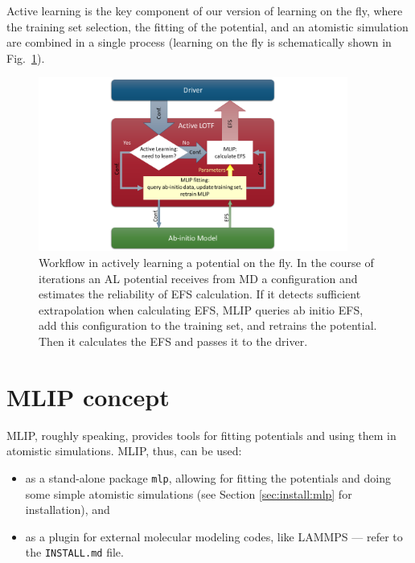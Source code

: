 \documentclass[12pt]{article}
\renewcommand{\_}{\char`_}
\begin{document}
Active learning is the key component of our version of learning on the fly, where the training set selection, the fitting of the potential, and an atomistic simulation are combined in a single process (learning on the fly is schematically shown in Fig.\ \ref{fig:LOTF}).

\begin{figure}[htbp]
	\centering
	\includegraphics[width=4.0in]{figs/LOTF.pdf}
	\caption{Workflow in actively learning a potential on the fly.
		In the course of iterations an AL potential receives from MD a configuration and estimates the reliability of EFS calculation.
		If it detects sufficient extrapolation when calculating EFS, MLIP queries ab initio EFS, add this configuration to the training set, and retrains the potential.
		Then it calculates the EFS and passes it to the driver.
	}
	\label{fig:LOTF}
\end{figure}

\section{MLIP concept} \label{sec:concept}

MLIP, roughly speaking, provides tools for fitting potentials and using them in atomistic simulations.
MLIP, thus, can be used:
\begin{itemize}
\item
as a stand-alone package \texttt{mlp}, allowing for fitting the potentials and doing some simple atomistic simulations (see Section \ref{sec:install:mlp} for installation), and

\item as a plugin for external molecular modeling codes, like LAMMPS --- refer to the \texttt{INSTALL.md} file.
\end{itemize}
\end{document}
